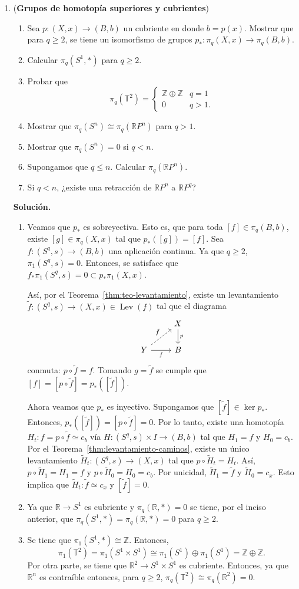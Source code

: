 \documentclass[11pt,a4paper]{article}
\theoremstyle{plain}
\theoremstyle{definition}
\theoremstyle{remark}
\newcommand{\RR}{\mathbb R}
\newcommand{\ZZ}{\mathbb Z}
\DeclareMathOperator{\Lev}{Lev}
\begin{document}
\begin{enumerate}[label=\arabic*.,leftmargin=*]
\item (\textbf{Grupos de homotopía superiores y cubrientes})
\begin{enumerate}[label=\alph*)]
\item Sea $p:(X,x)\to(B,b)$ un cubriente en donde $b=p(x)$. Mostrar que
para $q\ge2$, se tiene un isomorfismo de grupos
$p_*:\pi_q(X,x)\to\pi_q(B,b)$.
\item Calcular $\pi_q(S^1,*)$ para $q\ge2$.
\item Probar que
\[
\pi_q(\mathbb T^2)=\begin{cases}\ZZ\oplus\ZZ & q=1\\ 0 & q>1.\end{cases}
\]
\item Mostrar que $\pi_q(S^n)\cong\pi_q(\RR P^n)$ para $q>1$.
\item Mostrar que $\pi_q(S^n)=0$ si $q<n$.
\item Supongamos que $q\le n$. Calcular $\pi_q(\RR P^n)$.
\item Si $q<n$, ¿existe una retracción de $\RR P^n$ a $\RR P^q$?
\end{enumerate}

\noindent\textbf{Solución.}
\begin{enumerate}[label=\alph*)]
\item Veamos que $p_*$ es sobreyectiva. Esto es, que para toda
$[f]\in\pi_q(B,b)$, existe $[g]\in\pi_q(X,x)$ tal que $p_*([g])=[f]$. Sea
$f:(S^q,s)\to(B,b)$ una aplicación continua. Ya que $q\ge2$,
$\pi_1(S^q,s)=0$. Entonces, se satisface que
$f_*\pi_1(S^q,s)=0\subset p_*\pi_1(X,x)$.

Así, por el Teorema~\ref{thm:teo-levantamiento}, existe un levantamiento
$\tilde f:(S^q,s)\to(X,x)\in\Lev(f)$ tal que el diagrama
\[
\begin{tikzcd}
& X \arrow[d,"p"] \\
Y \arrow[ur,dashed,"\tilde f"] \arrow[r,swap,"f"] & B
\end{tikzcd}
\]
conmuta: $p\circ\tilde f=f$. Tomando $g=\tilde f$ se cumple que
$[f]=[p\circ\tilde f]=p_*([\tilde f])$.

Ahora veamos que $p_*$ es inyectivo. Supongamos que $[\tilde f]\in\ker p_*$.
Entonces, $p_*([\tilde f])=[p\circ\tilde f]=0$. Por lo tanto, existe una
homotopía $H_t:f=p\circ\tilde f\simeq c_b$ vía
$H:(S^q,s)\times I\to(B,b)$ tal que $H_1=f$ y $H_0=c_b$. Por el
Teorema~\ref{thm:levantamiento-caminos}, existe un único levantamiento
$\tilde H_t:(S^q,s)\to(X,x)$ tal que $p\circ\tilde H_t=H_t$. Así,
$p\circ\tilde H_1=H_1=f$ y $p\circ\tilde H_0=H_0=c_b$. Por unicidad,
$\tilde H_1=\tilde f$ y $\tilde H_0=c_x$. Esto implica que
$\tilde H_t:\tilde f\simeq c_x$ y $[\tilde f]=0$.
\item Ya que $\RR\to S^1$ es cubriente y $\pi_q(\RR,*)=0$ se tiene, por el
inciso anterior, que $\pi_q(S^1,*)=\pi_q(\RR,*)=0$ para $q\ge2$.
\item Se tiene que $\pi_1(S^1,*)\cong\ZZ$. Entonces,
\[
\pi_1(\mathbb T^2)=\pi_1(S^1\times S^1)\cong\pi_1(S^1)\oplus\pi_1(S^1)=\ZZ\oplus\ZZ.
\]
Por otra parte, se tiene que $\RR^2\to S^1\times S^1$ es cubriente.
Entonces, ya que $\RR^n$ es contraíble entonces, para $q\ge2$,
$\pi_q(\mathbb T^2)\cong\pi_q(\RR^2)=0$.


\end{enumerate}
\end{enumerate}
\end{document}
